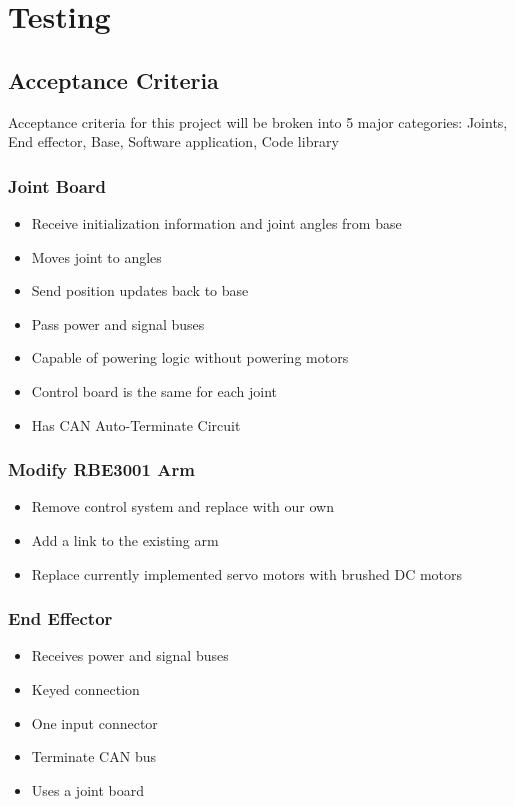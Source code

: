 \section{Testing}
\subsection{Acceptance Criteria}
Acceptance criteria for this project will be broken into 5 major categories: Joints, End effector, Base, Software application, Code library

\subsubsection{Joint Board}
\begin{itemize}
	\item Receive initialization information and joint angles from base
	\item Moves joint to angles
	\item Send position updates back to base
	\item Pass power and signal buses
	\item Capable of powering logic without powering motors
	\item Control board is the same for each joint
	\item Has CAN Auto-Terminate Circuit
\end{itemize}

\subsubsection{Modify RBE3001 Arm}
\begin{itemize}
	\item Remove control system and replace with our own 
	\item Add a link to the existing arm
	\item Replace currently implemented servo motors with brushed DC motors
\end{itemize}

\subsubsection{End Effector}
\begin{itemize}
	\item Receives power and signal buses
	\item Keyed connection
	\item One input connector
	\item Terminate CAN bus
	\item Uses a joint board
\end{itemize}

